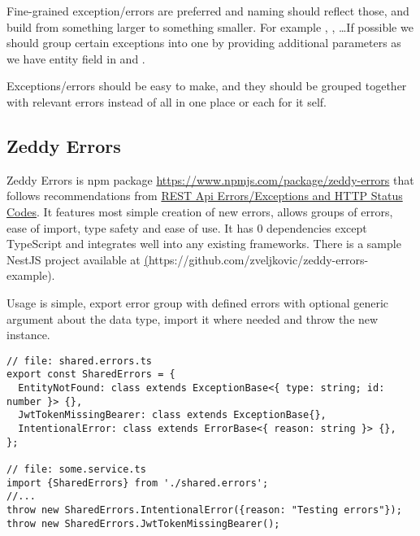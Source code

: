     Fine-grained exception/errors are preferred and naming should reflect those, and build
    from something larger to something smaller.
    For example ,
    , \ldots If possible we should group certain exceptions into
    one by providing additional parameters as we have entity field in 
    and .

    Exceptions/errors should be easy to make, and they should be grouped together with relevant
    errors instead of all in one place or each for it self.

    \subsection{Zeddy Errors}\label{subsec:zeddy-errors}

    Zeddy Errors is npm package \href{https://www.npmjs.com/package/zeddy-errors}{https://www.npmjs.com/package/zeddy-errors} that follows recommendations 
    from \hyperref[sec:REST Api Errors/Exceptions and HTTP Status Codes]{REST Api Errors/Exceptions and HTTP Status Codes}.
    It features most simple creation of new errors, allows groups of errors, ease of import,
    type safety and ease of use.
    It has 0 dependencies except TypeScript and integrates well into
    any existing frameworks.
    There is a sample NestJS project available at \href{https://github.com/zveljkovic/zeddy-errors-example}(https://github.com/zveljkovic/zeddy-errors-example).

    Usage is simple, export error group with defined errors with optional generic argument about the data type,
    import it where needed and throw the new instance.

    \begin{verbatim}
// file: shared.errors.ts
export const SharedErrors = {
  EntityNotFound: class extends ExceptionBase<{ type: string; id: number }> {},
  JwtTokenMissingBearer: class extends ExceptionBase{},
  IntentionalError: class extends ErrorBase<{ reason: string }> {},
};

// file: some.service.ts
import {SharedErrors} from './shared.errors';
//...
throw new SharedErrors.IntentionalError({reason: "Testing errors"});
throw new SharedErrors.JwtTokenMissingBearer();

    \end{verbatim}


